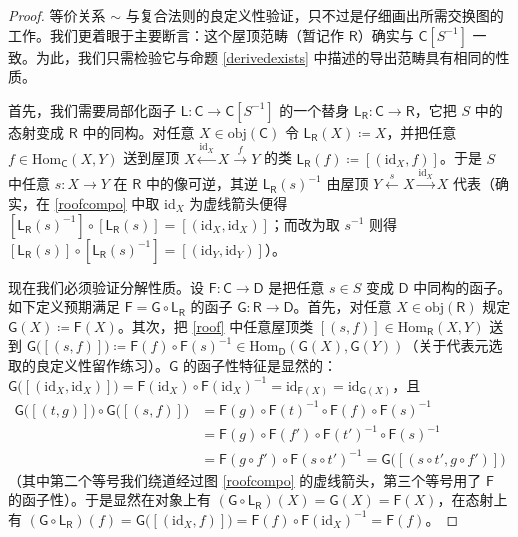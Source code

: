 \begin{proof}
	等价关系 $\sim$ 与复合法则的良定义性验证，只不过是仔细画出所需交换图的工作。我们更着眼于主要断言：这个屋顶范畴（暂记作 $\mathsf{R}$）确实与 $\mathsf{C}[S^{-1}]$ 一致。为此，我们只需检验它与命题 \ref{derivedexists} 中描述的导出范畴具有相同的性质。
	
	首先，我们需要局部化函子 $\mathsf{L}:\mathsf{C}\rightarrow\mathsf{C}[S^{-1}]$ 的一个替身 $\mathsf{L_R}:\mathsf{C}\rightarrow\mathsf{R}$，它把 $S$ 中的态射变成 $\mathsf{R}$ 中的同构。对任意 $X\in\text{obj}(\mathsf{C})$ 令 $\mathsf{L_R}(X)\coloneqq X$，并把任意 $f\in\text{Hom}_\mathsf{C}(X,Y)$ 送到屋顶 $X\xleftarrow{\text{id}_X} X\xrightarrow{f} Y$ 的类 $\mathsf{L_R}(f)\coloneqq[(\text{id}_X,f)]$。于是 $S$ 中任意 $s:X\rightarrow Y$ 在 $\mathsf{R}$ 中的像可逆，其逆 $\mathsf{L_R}(s)^{-1}$ 由屋顶 $Y\xleftarrow{s} X\xrightarrow{\text{id}_X} X$ 代表（确实，在 \eqref{roofcompo} 中取 $\text{id}_X$ 为虚线箭头便得 $[\mathsf{L_R}(s)^{-1}]\circ[\mathsf{L_R}(s)]=[(\text{id}_X,\text{id}_X)]$；而改为取 $s^{-1}$ 则得 $[\mathsf{L_R}(s)]\circ[\mathsf{L_R}(s)^{-1}]=[(\text{id}_Y,\text{id}_Y)]$）。
	
	现在我们必须验证分解性质。设 $\mathsf{F}:\mathsf{C}\rightarrow\mathsf{D}$ 是把任意 $s\in S$ 变成 $\mathsf{D}$ 中同构的函子。如下定义预期满足 $\mathsf{F}=\mathsf{G}\circ\mathsf{L_R}$ 的函子 $\mathsf{G}:\mathsf{R}\rightarrow\mathsf{D}$。首先，对任意 $X\in\text{obj}(\mathsf{R})$ 规定 $\mathsf{G}(X)\coloneqq \mathsf{F}(X)$。其次，把 \eqref{roof} 中任意屋顶类 $[(s,f)]\in\text{Hom}_\mathsf{R}(X,Y)$ 送到 $\mathsf{G}\big([(s,f)]\big)\coloneqq\mathsf{F}(f)\circ\mathsf{F}(s)^{-1}\in\text{Hom}_\mathsf{D}(\mathsf{G}(X),\mathsf{G}(Y))$（关于代表元选取的良定义性留作练习）。$\mathsf{G}$ 的函子性特征是显然的：$\mathsf{G}\big([(\text{id}_X,\text{id}_X)]\big)=\mathsf{F}(\text{id}_X)\circ\mathsf{F}(\text{id}_X)^{-1}=\text{id}_{\mathsf{F}(X)}=\text{id}_{\mathsf{G}(X)}$，且
	\begin{align*}
		\mathsf{G}\big([(t,g)]\big)\circ\mathsf{G}\big([(s,f)]\big) &=\mathsf{F}(g)\circ\mathsf{F}(t)^{-1}\circ\mathsf{F}(f)\circ\mathsf{F}(s)^{-1} \\
		&=\mathsf{F}(g)\circ\mathsf{F}(f')\circ\mathsf{F}(t')^{-1}\circ\mathsf{F}(s)^{-1} \\
		&=\mathsf{F}(g\circ f')\circ\mathsf{F}(s\circ t')^{-1}=\mathsf{G}\big([(s\circ t', g\circ f')]\big)	
	\end{align*}
	（其中第二个等号我们绕道经过图 \eqref{roofcompo} 的虚线箭头，第三个等号用了 $\mathsf{F}$ 的函子性）。于是显然在对象上有 $(\mathsf{G}\circ\mathsf{L_R})(X)=\mathsf{G}(X)=\mathsf{F}(X)$，在态射上有 $(\mathsf{G}\circ\mathsf{L_R})(f)=\mathsf{G}\big([(\text{id}_X,f)]\big)=\mathsf{F}(f)\circ\mathsf{F}(\text{id}_X)^{-1}=\mathsf{F}(f)$。 
	

\end{proof}
